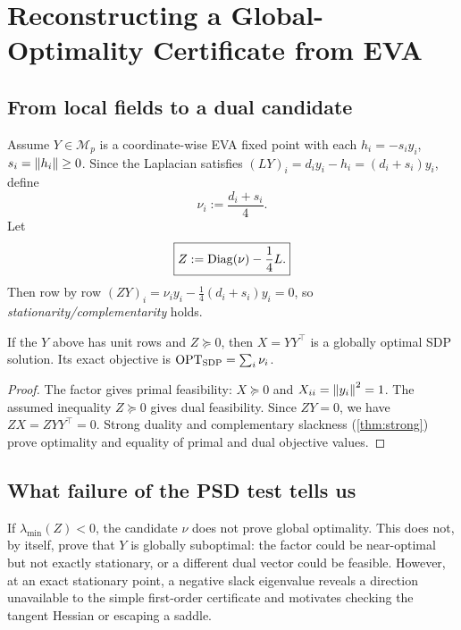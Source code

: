 \chapter{Reconstructing a Global-Optimality Certificate from EVA}\label{ch:certificate}
\section{From local fields to a dual candidate}
Assume $Y\in\mathcal M_p$ is a coordinate-wise EVA fixed point with each $h_i=-s_iy_i$, $s_i=\left\lVert h_i\right\rVert\ge0$. Since the Laplacian satisfies $(LY)_i=d_iy_i-h_i=(d_i+s_i)y_i$, define
\begin{equation}\label{eq:eva-nu}
\boxed{\nu_i:=\frac{d_i+s_i}{4}.}
\end{equation}
Let
\begin{equation}\label{eq:eva-slack}
\boxed{Z:=\operatorname{Diag}(\nu)-\frac14L.}
\end{equation}
Then row by row $(ZY)_i=\nu_i y_i-\frac14(d_i+s_i)y_i=0$, so \emph{stationarity/complementarity} holds.

\begin{theorem}\label{thm:eva-cert}
If the $Y$ above has unit rows and $Z\succeq0$, then $X=YY^\top$ is a globally optimal SDP solution. Its exact objective is $\operatorname{OPT}_{\mathrm{SDP}}=\sum_i\nu_i$.
\end{theorem}
\begin{proof}
The factor gives primal feasibility: $X\succeq0$ and $X_{ii}=\left\lVert y_i\right\rVert^2=1$. The assumed inequality $Z\succeq0$ gives dual feasibility. Since $ZY=0$, we have $ZX=ZYY^\top=0$. Strong duality and complementary slackness (\cref{thm:strong}) prove optimality and equality of primal and dual objective values.
\end{proof}

\section{What failure of the PSD test tells us}
If $\lambda_{\min}(Z)<0$, the candidate $\nu$ does not prove global optimality. This does not, by itself, prove that $Y$ is globally suboptimal: the factor could be near-optimal but not exactly stationary, or a different dual vector could be feasible. However, at an exact stationary point, a negative slack eigenvalue reveals a direction unavailable to the simple first-order certificate and motivates checking the tangent Hessian or escaping a saddle.

